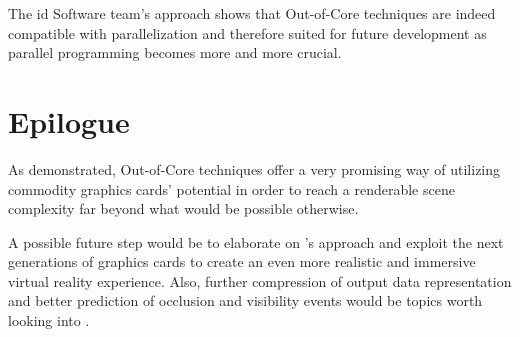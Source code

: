 The id Software team's approach shows that Out-of-Core techniques are indeed compatible with parallelization and therefore suited for future development as parallel programming becomes more and more crucial.

\chapter{Epilogue}
\label{ch:Epilogue}

As demonstrated, Out-of-Core techniques offer a very promising way of utilizing commodity graphics cards' potential in order to reach a renderable scene complexity far beyond what would be possible otherwise. 

A possible future step would be to elaborate on \cite{10.1007/978-3-540-40014-1_3}'s approach and exploit the next generations of graphics cards to create an even more realistic and immersive virtual reality experience. Also, further compression of output data representation and better prediction of occlusion and visibility events would be topics worth looking into \cite{Gobbetti:2005:FVM:1073204.1073277}.